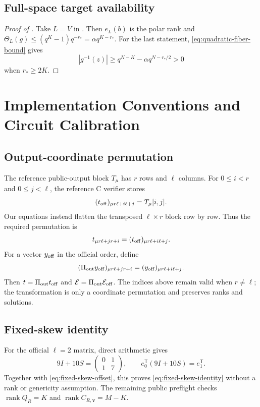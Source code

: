 \documentclass[11pt]{article}
\newcommand{\rank}{\operatorname{rank}}
\newcommand{\transpose}{\mathsf T}
\begin{document}
\subsection{Full-space target availability}\label{app:proof-full-space}

\begin{proof}[Proof of ]
Take $L=V$ in .  Then $e_L(b)$ is the polar rank and
$\Theta_L(g)\le(q^K-1)q^{-r_*}=\alpha q^{K-r_*}$.  For the last statement, \eqref{eq:quadratic-fiber-bound} gives
\[
 |g^{-1}(z)|\ge q^{N-K}-\alpha q^{N-r_*/2}>0
\]
when $r_*\ge2K$.
\end{proof}

\section{Implementation Conventions and Circuit Calibration}
\label{app:implementation}

\subsection{Output-coordinate permutation}\label{app:output-permutation}

The reference public-output block $T_\mu$ has $r$ rows and $\ell$ columns.
For $0\le i<r$ and $0\le j<\ell$, the reference C verifier stores
\[
 (t_{\rm off})_{\mu r\ell+i\ell+j}=T_\mu[i,j].
\]
Our equations instead flatten the transposed $\ell\times r$ block row by row.
Thus the required permutation is
\[
  t_{\mu r\ell+jr+i}
  =(t_{\rm off})_{\mu r\ell+i\ell+j}.
\]
For a vector $y_{\rm off}$ in the official order, define
\[
 (\Pi_{\rm out}y_{\rm off})_{\mu r\ell+jr+i}
 =(y_{\rm off})_{\mu r\ell+i\ell+j}.
\]
Then $t=\Pi_{\rm out}t_{\rm off}$ and
$\mathcal E=\Pi_{\rm out}\mathcal E_{\rm off}$.  The indices above remain
valid when $r\ne\ell$; the transformation is only a coordinate permutation
and preserves ranks and solutions.

\subsection{Fixed-skew identity}\label{app:fixed-skew}

For the official $\ell=2$ matrix, direct arithmetic gives
\[
 9I+10S=\begin{pmatrix}0&1\\1&7\end{pmatrix},
 \qquad e_0^\transpose(9I+10S)=e_1^\transpose.
\]
Together with \eqref{eq:fixed-skew-offset}, this proves
\eqref{eq:fixed-skew-identity} without a rank or genericity assumption.  The
remaining public preflight checks $\rank Q_R=K$ and
$\rank C_{R,\mathbf v}=M-K$.
\end{document}
